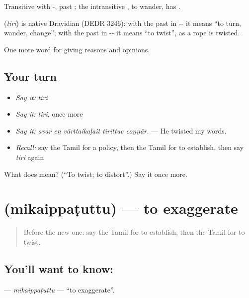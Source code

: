 Transitive with -, past ; the intransitive , to wander, has .

\begin{cousinweb}
\textbf{} (\emph{tiri}) is native Dravidian (DEDR 3246): with the past in -- it means \textquotedblleft{}to turn, wander, change\textquotedblright{}; with the past in -- it means \textquotedblleft{}to twist\textquotedblright{}, as a rope is twisted.
\end{cousinweb}

\begin{grammarlens}[title={What you've built}]
One more word for giving reasons and opinions.
\end{grammarlens}

\subsection*{Your turn}
\begin{itemize}
\raggedright
  \item \emph{Say it:} \emph{tiri}
  \item \emph{Say it:} \emph{tiri}, once more
  \item \emph{Say it:} \emph{avar eṉ vārttaikaḷait tirittuc coṉṉār.} — He twisted my words.
  \item \emph{Recall:} say the Tamil for a policy, then the Tamil for to establish, then say \emph{tiri} again
\end{itemize}

\begin{tcolorbox}[breakable,colback=teal!4,colframe=teal!35!black,title={Before you move on}]
What does  mean? (\textquotedblleft{}To twist; to distort\textquotedblright{}.) Say it once more.
\end{tcolorbox}
\section[\texorpdfstring{\ta{மிகைப்படுத்து} (mikaippaṭuttu)}{மிகைப்படுத்து (mikaippaṭuttu)}]{ (mikaippaṭuttu) — to exaggerate}

\label{lesson:TA-C359-mikaippatuttu}



\begin{quote}
Before the new one: say the Tamil for to establish, then the Tamil for to twist.
\end{quote}

\subsection*{You'll want to know: }
\textbf{} — \emph{mikaippaṭuttu} — \textquotedblleft{}to exaggerate\textquotedblright{}.

